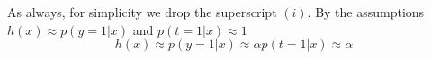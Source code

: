 \begin{answer}
As always, for simplicity we drop the superscript $(i).$
By the assumptions $h(x)\approx p(y = 1|x) $ and $p(t = 1|x) \approx 1$
$$h(x)\approx p(y = 1|x) \approx \alpha p(t = 1|x) \approx \alpha$$
\end{answer}
